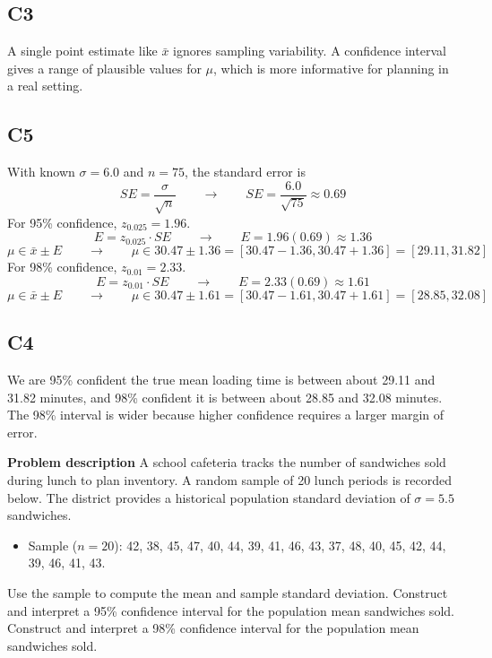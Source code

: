 \begin{ExamProblems}
		\subsection*{C3}
		A single point estimate like $\bar{x}$ ignores sampling variability. A confidence interval gives a range of plausible values for $\mu$, which is more informative for planning in a real setting.

		\subsection*{C5}
		With known $\sigma = 6.0$ and $n=75$, the standard error is
		\[
		SE = \frac{\sigma}{\sqrt{n}} \qquad \longrightarrow \qquad SE = \frac{6.0}{\sqrt{75}} \approx 0.69
		\]
		For 95\% confidence, $z_{0.025}=1.96$.
		\[
		E = z_{0.025} \cdot SE \qquad \longrightarrow \qquad E = 1.96(0.69) \approx 1.36
		\]
		\[
		\mu \in \bar{x} \pm E \qquad \longrightarrow \qquad \mu \in 30.47 \pm 1.36 = [30.47 - 1.36, 30.47 + 1.36] = [29.11, 31.82]
		\]
		For 98\% confidence, $z_{0.01}=2.33$.
		\[
		E = z_{0.01} \cdot SE \qquad \longrightarrow \qquad E = 2.33(0.69) \approx 1.61
		\]
		\[
		\mu \in \bar{x} \pm E \qquad \longrightarrow \qquad \mu \in 30.47 \pm 1.61 = [30.47 - 1.61, 30.47 + 1.61] = [28.85, 32.08]
		\]

		\subsection*{C4}
		We are 95\% confident the true mean loading time is between about 29.11 and 31.82 minutes, and 98\% confident it is between about 28.85 and 32.08 minutes. The 98\% interval is wider because higher confidence requires a larger margin of error.

		\item
		\textbf{Problem description}
		A school cafeteria tracks the number of sandwiches sold during lunch to plan inventory.
		A random sample of 20 lunch periods is recorded below. The district provides a historical population standard deviation of \(\sigma = 5.5\) sandwiches.

		\begin{itemize}
			\item Sample (\(n = 20\)): 42, 38, 45, 47, 40, 44, 39, 41, 46, 43, 37, 48, 40, 45, 42, 44, 39, 46, 41, 43.
		\end{itemize}

		Use the sample to compute the mean and sample standard deviation.
		Construct and interpret a 95\% confidence interval for the population mean sandwiches sold.
		Construct and interpret a 98\% confidence interval for the population mean sandwiches sold.


\end{ExamProblems}
